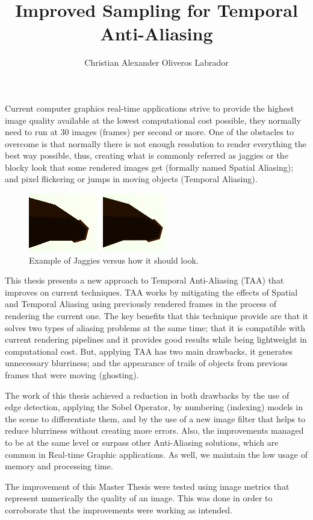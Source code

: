 \documentclass{popsci}
\author{Christian Alexander Oliveros Labrador}
\title{Improved Sampling for Temporal Anti-Aliasing}
\begin{document}


{\noindent Current computer graphics real-time applications strive to provide the highest image quality available at the lowest computational cost possible, they normally need to run at 30 images (frames) per second or more. One of the obstacles to overcome is that normally there is not enough resolution to render everything the best way possible, thus, creating what is commonly referred as jaggies or the blocky look that some rendered images get (formally named Spatial Aliasing); and pixel flickering or jumps in moving objects (Temporal Aliasing).   
	
\begin{figure}[!hbt]
	\centering
	\includegraphics[scale=1.4]{images/pipe_sobel_no_aa.png}
	\caption{Example of Jaggies versus how it should look.}\label{fig:jaggies}
\end{figure}
	
This thesis presents a new approach to Temporal Anti-Aliasing (TAA) that improves on current techniques. TAA works by mitigating the effects of Spatial and Temporal Aliasing using previously rendered frames in the process of rendering the current one. The key benefits that this technique provide are that it solves two types of aliasing problems at the same time; that it is compatible with current rendering pipelines and it provides good results while being lightweight in computational cost. But, applying TAA has two main drawbacks, it generates unnecessary blurriness; and the appearance of trails of objects from previous frames that were moving (ghosting). 

The work of this thesis achieved a reduction in both drawbacks by the use of edge detection, applying the Sobel Operator, by numbering (indexing) models in the scene to differentiate them, and by the use of a new image filter that helps to reduce blurriness without creating more errors. Also, the improvements managed to be at the same level or surpass other Anti-Aliasing solutions, which are common in Real-time Graphic applications. As well, we maintain the low usage of memory and processing time.

The improvement of this Master Thesis were tested using image metrics that represent numerically the quality of an image. This was done in order to corroborate that the improvements were working as intended.
	
}
\end{document}

